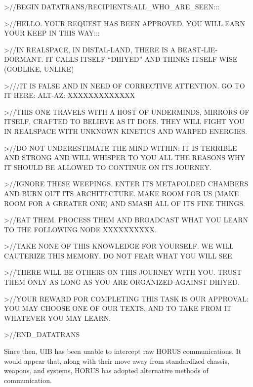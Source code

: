                  >//BEGIN DATATRANS/RECIPIENTS:ALL\_WHO\_ARE\_SEEN:::


                 >//HELLO. YOUR REQUEST HAS BEEN APPROVED. YOU WILL EARN YOUR KEEP IN
                 THIS WAY:::


                 >//IN REALSPACE, IN DISTAL-LAND, THERE IS A BEAST-LIE-DORMANT. IT CALLS
                 ITSELF “DHIYED” AND THINKS ITSELF WISE (GODLIKE, UNLIKE)


                 >///IT IS FALSE AND IN NEED OF CORRECTIVE ATTENTION. GO TO IT HERE: ALT-AZ:
                 XXXXXXXXXXXXX


                 >//THIS ONE TRAVELS WITH A HOST OF UNDERMINDS, MIRRORS OF ITSELF,
                 CRAFTED TO BELIEVE AS IT DOES. THEY WILL FIGHT YOU IN REALSPACE WITH
                 UNKNOWN KINETICS AND WARPED ENERGIES.





                  >//DO NOT UNDERESTIMATE THE MIND WITHIN: IT IS TERRIBLE AND STRONG AND
                  WILL WHISPER TO YOU ALL THE REASONS WHY IT SHOULD BE ALLOWED TO
                  CONTINUE ON ITS JOURNEY.


                  >//IGNORE THESE WEEPINGS. ENTER ITS METAFOLDED CHAMBERS AND BURN OUT
                  ITS ARCHITECTURE. MAKE ROOM FOR US (MAKE ROOM FOR A GREATER ONE) AND
                  SMASH ALL OF ITS FINE THINGS.


                  >//EAT THEM. PROCESS THEM AND BROADCAST WHAT YOU LEARN TO THE
                  FOLLOWING NODE XXXXXXXXXX.


                  >//TAKE NONE OF THIS KNOWLEDGE FOR YOURSELF. WE WILL CAUTERIZE THIS
                  MEMORY. DO NOT FEAR WHAT YOU WILL SEE.


                  >//THERE WILL BE OTHERS ON THIS JOURNEY WITH YOU. TRUST THEM ONLY AS
                  LONG AS YOU ARE ORGANIZED AGAINST DHIYED.


                  >//YOUR REWARD FOR COMPLETING THIS TASK IS OUR APPROVAL: YOU MAY
                  CHOOSE ONE OF OUR TEXTS, AND TO TAKE FROM IT WHATEVER YOU MAY LEARN.


                  >//END\_DATATRANS


Since then, UIB has been unable to intercept raw HORUS communications. It would appear
that, along with their move away from standardized chassis, weapons, and systems, HORUS
has adopted alternative methods of communication.



